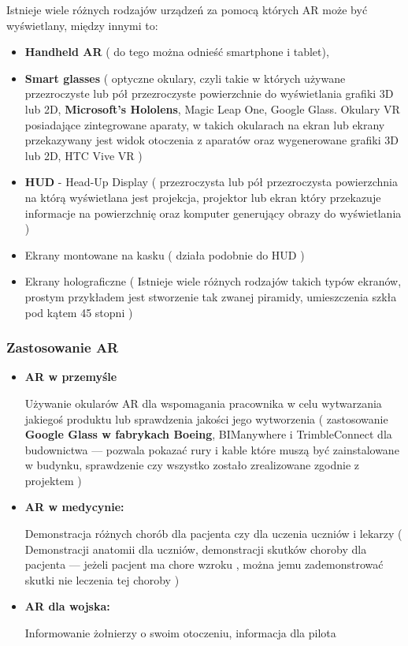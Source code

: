 Istnieje wiele różnych rodzajów urządzeń za pomocą których AR może być wyświetlany, między innymi to:

\begin{itemize}
	\item \textbf{Handheld AR} ( do tego można odnieść smartphone i tablet), 
	\item \textbf{Smart glasses} ( optyczne okulary, czyli takie w których używane przezroczyste lub pół przezroczyste powierzchnie do wyświetlania grafiki 3D lub 2D, \textbf{Microsoft’s Hololens}, Magic Leap One, Google Glass. Okulary VR posiadające zintegrowane aparaty, w takich okularach na ekran lub ekrany przekazywany jest widok otoczenia z aparatów oraz wygenerowane grafiki 3D lub 2D, HTC Vive VR ) 
	\item \textbf{HUD} - Head-Up Display ( przezroczysta lub pół przezroczysta powierzchnia na którą wyświetlana jest projekcja, projektor lub ekran który przekazuje informacje na powierzchnię oraz komputer generujący obrazy do wyświetlania ) 
	\item Ekrany montowane na kasku ( działa podobnie do HUD ) 
	\item Ekrany holograficzne ( Istnieje wiele różnych rodzajów takich typów ekranów, prostym przykładem jest stworzenie tak zwanej piramidy, umieszczenia szkła pod kątem 45 stopni )
\end{itemize}

\subsubsection{Zastosowanie AR}

\begin{itemize}
	\item \textbf{AR w przemyśle}
	
	Używanie okularów AR dla wspomagania pracownika w celu wytwarzania jakiegoś produktu lub sprawdzenia jakości jego wytworzenia ( zastosowanie \textbf{Google Glass w fabrykach Boeing}, BIManywhere i TrimbleConnect dla budownictwa — pozwala pokazać rury i kable które muszą być zainstalowane w budynku, sprawdzenie czy wszystko zostało zrealizowane zgodnie z projektem ) 
	
	\item \textbf{AR w medycynie: }
	
	Demonstracja różnych chorób dla pacjenta czy dla uczenia uczniów i lekarzy ( Demonstracji anatomii dla uczniów, demonstracji skutków choroby dla pacjenta — jeżeli pacjent ma chore wzroku , można jemu zademonstrować skutki nie leczenia tej choroby ) 
	
	\item \textbf{AR dla wojska: }
	
	Informowanie żołnierzy o swoim otoczeniu, informacja dla pilota
\end{itemize}

